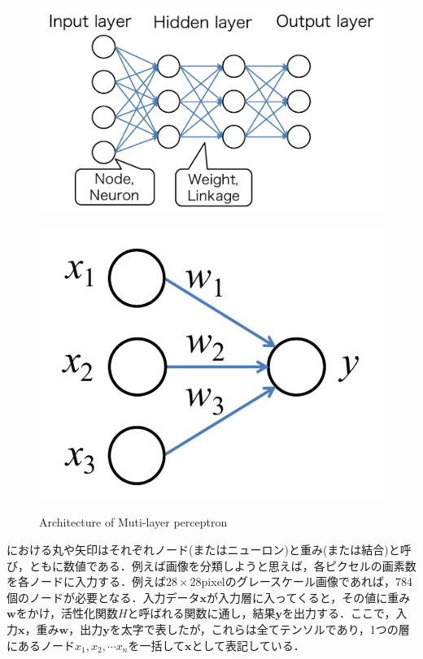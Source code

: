 \begin{figure}[H]
	\centering
	\begin{minipage}[b]{0.4\columnwidth}
		\centering
		\includegraphics[width=1.2\linewidth]{fig/MLP}
		\label{fig:mlp}
	\end{minipage}
	\begin{minipage}[b]{0.4\columnwidth}
		\centering
		\includegraphics[width=0.7\linewidth]{fig/simple_perceptron}
		\label{fig:perceptron}
	\end{minipage}
	\caption{Architecture of Muti-layer perceptron}
\end{figure}

における丸や矢印はそれぞれノード(またはニューロン)と重み(または結合)と呼び，ともに数値である．例えば画像を分類しようと思えば，各ピクセルの画素数を各ノードに入力する．例えば$28 \times 28$pixelのグレースケール画像であれば，784個のノードが必要となる．入力データ$\bm {x}$が入力層に入ってくると，その値に重み$\bm {w}$をかけ，活性化関数$H$と呼ばれる関数に通し，結果$\bm{y}$を出力する．ここで，入力$\bm{x}$，重み$\bm{w}$，出力$\bm{y}$を太字で表したが，これらは全てテンソルであり，1つの層にあるノード$x_1, x_2, \cdots x_n$を一括して$\bm {x}$として表記している．

